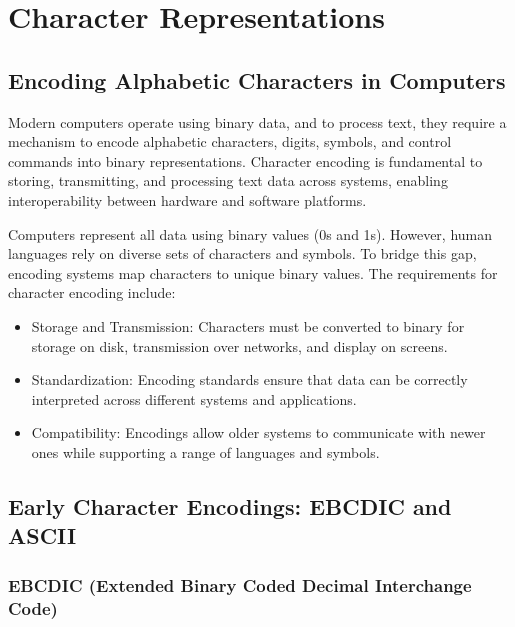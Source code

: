 \chapter{Character Representations}
\localtoc
\section{Encoding Alphabetic Characters in Computers}
Modern computers operate using binary data, and to process text, they require a mechanism to encode alphabetic characters, digits, symbols, and control commands into binary representations. Character encoding is fundamental to storing, transmitting, and processing text data across systems, enabling interoperability between hardware and software platforms.

Computers represent all data using binary values (0s and 1s). However, human languages rely on diverse sets of characters and symbols. To bridge this gap, encoding systems map characters to unique binary values. The requirements for character encoding include:
\begin{itemize}
    \item Storage and Transmission: Characters must be converted to binary for storage on disk, transmission over networks, and display on screens.
    \item Standardization: Encoding standards ensure that data can be correctly interpreted across different systems and applications.
    \item Compatibility: Encodings allow older systems to communicate with newer ones while supporting a range of languages and symbols.
\end{itemize}

\section{Early Character Encodings: EBCDIC and ASCII}

\subsection{EBCDIC (Extended Binary Coded Decimal Interchange Code)}

